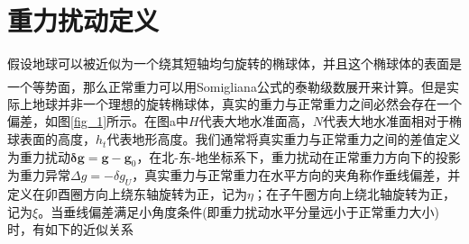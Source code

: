 \documentclass[12pt,a4,utf8]{article}
\newcommand{\upcite}[1]{\textsuperscript{\textsuperscript{\cite{#1}}}} %
\begin{document}
\section{重力扰动定义}

假设地球可以被近似为一个绕其短轴均匀旋转的椭球体，并且这个椭球体的表面是一个等势面，那么正常重力可以用Somigliana公式的泰勒级数展开来计算\upcite{somigliana1929teoria}。但是实际上地球并非一个理想的旋转椭球体，真实的重力与正常重力之间必然会存在一个偏差，如图\ref{fig_1}所示。在图a中$H$代表大地水准面高，$N$代表大地水准面相对于椭球表面的高度，$h_t$代表地形高度。我们通常将真实重力与正常重力之间的差值定义为重力扰动$\bm{\delta g} = \bm{g} - \bm{g}_0$，在北-东-地坐标系下，重力扰动在正常重力方向下的投影为重力异常$\Delta g = -\delta g_U $，真实重力与正常重力在水平方向的夹角称作垂线偏差，并定义在卯酉圈方向上绕东轴旋转为正，记为$\eta$；在子午圈方向上绕北轴旋转为正，记为$\xi$。当垂线偏差满足小角度条件(即重力扰动水平分量远小于正常重力大小)时，有如下的近似关系
 
\end{document}
